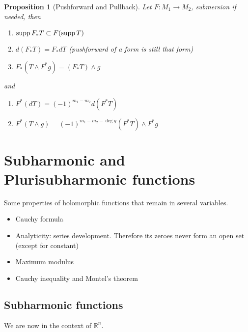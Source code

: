 \documentclass[11pt]{article}
\newtheorem{proposition}{Proposition}[theorem]
\newcommand{\supp}{\mathop{\rm supp}\nolimits}
\begin{document}
\begin{proposition}[Pushforward and Pullback]
Let \(F: M_1 \longrightarrow M_2\), submersion if needed, then
\begin{enumerate}
\item \(\supp F_* T \subset F(\supp T)\)
\item \(d(F_* T) = F_* dT\) (pushforward of a form is still that form)
\item \(F_*(T\wedge F^* g) = (F_*T)\wedge g\)
\end{enumerate}
and
\begin{enumerate}
\item \(F^*(dT) = (-1)^{m_1-m_2} d(F^* T)\)
\item \(F^*(T\wedge g) = (-1)^{m_1-m_2 -\deg g}(F^* T)\wedge F^* g\)
\end{enumerate}
\end{proposition}



\section{Subharmonic and Plurisubharmonic functions}
\label{sec:orgbf45ff7}

Some properties of holomorphic functions that remain in several variables.
\begin{itemize}
\item Cauchy formula
\item Analyticity: series development. Therefore its zeroes never form an open set (except for constant)
\item Maximum modulus
\item Cauchy inequality and Montel's theorem
\end{itemize}


\subsection{Subharmonic functions}
\label{sec:orge070dfc}
We are now in the context of \(\mathbb{R}^n\).
\end{document}
